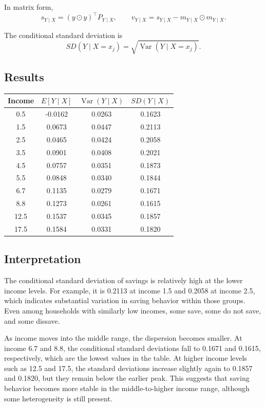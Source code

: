 \documentclass[12pt]{article}
\begin{document}
In matrix form,
\[
s_{Y\mid X}=(y\odot y)^\top P_{Y\mid X},
\qquad
v_{Y\mid X}=s_{Y\mid X}-m_{Y\mid X}\odot m_{Y\mid X}.
\]

The conditional standard deviation is
\[
SD(Y\mid X=x_j)=\sqrt{\operatorname{Var}(Y\mid X=x_j)}.
\]

\subsection*{Results}

\begin{center}
\begin{tabular}{cccc}
\toprule
Income & $E[Y\mid X]$ & $\operatorname{Var}(Y\mid X)$ & $SD(Y\mid X)$ \\
\midrule
0.5  & -0.0162 & 0.0263 & 0.1623 \\
1.5  & 0.0673  & 0.0447 & 0.2113 \\
2.5  & 0.0465  & 0.0424 & 0.2058 \\
3.5  & 0.0901  & 0.0408 & 0.2021 \\
4.5  & 0.0757  & 0.0351 & 0.1873 \\
5.5  & 0.0848  & 0.0340 & 0.1844 \\
6.7  & 0.1135  & 0.0279 & 0.1671 \\
8.8  & 0.1273  & 0.0261 & 0.1615 \\
12.5 & 0.1537  & 0.0345 & 0.1857 \\
17.5 & 0.1584  & 0.0331 & 0.1820 \\
\bottomrule
\end{tabular}
\end{center}

\subsection*{Interpretation}

The conditional standard deviation of savings is relatively high at the lower income levels. For example, it is 0.2113 at income 1.5 and 0.2058 at income 2.5, which indicates substantial variation in saving behavior within those groups. Even among households with similarly low incomes, some save, some do not save, and some dissave.

As income moves into the middle range, the dispersion becomes smaller. At income 6.7 and 8.8, the conditional standard deviations fall to 0.1671 and 0.1615, respectively, which are the lowest values in the table. At higher income levels such as 12.5 and 17.5, the standard deviations increase slightly again to 0.1857 and 0.1820, but they remain below the earlier peak. This suggests that saving behavior becomes more stable in the middle-to-higher income range, although some heterogeneity is still present.
\end{document}
